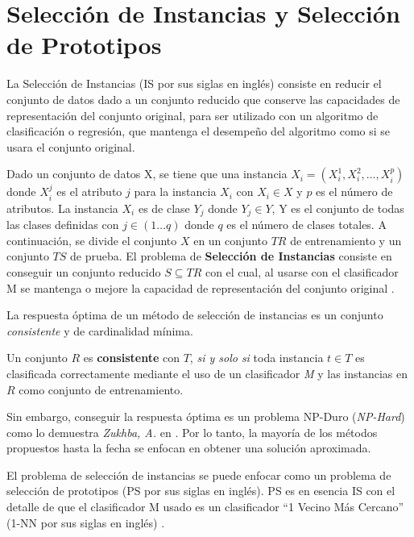 \section{Selección de Instancias y Selección de Prototipos}

La Selección de Instancias (IS por sus siglas en inglés) consiste en reducir el conjunto de datos dado a un conjunto reducido que conserve las capacidades de representación del conjunto original, para ser utilizado con un algoritmo de clasificación o regresión, que mantenga el desempeño del algoritmo como si se usara el conjunto original.\\

\begin{definicion}
Dado un conjunto de datos X, se tiene que una instancia $X_i = (X_i^1,X_i^2,\dots,X_i^p)$ donde $X_i^j$ es el atributo $j$ para la instancia $X_i$ con $X_i\in X$ y $p$ es el número de atributos. La instancia $X_i$ es de clase $Y_j$ donde $Y_j\in Y$, Y es el conjunto de todas las clases definidas con $j\in (1\dots q)$ donde $q$ es el número de clases totales. A continuación, se divide el conjunto $X$ en un conjunto $TR$ de entrenamiento y un conjunto $TS$ de prueba. El problema de \textbf{Selección de Instancias} consiste en conseguir un conjunto reducido $S\subseteq TR$ con el cual, al usarse con el clasificador M se mantenga o mejore la capacidad de representación del conjunto original \cite{garcia2016data}.
\end{definicion}

La respuesta óptima de un método de selección de instancias es un conjunto \emph{consistente} y de cardinalidad mínima.\\

\begin{definicion}
Un conjunto $R$ es \textbf{consistente} con $T$, \emph{si y solo si} toda instancia $t \in T$ es clasificada correctamente mediante el uso de un clasificador \emph{M} y las instancias en $R$ como conjunto de entrenamiento. \cite{flores2014metaheuristics}
\end{definicion}

Sin embargo, conseguir la respuesta óptima es un problema NP-Duro (\emph{NP-Hard}) como lo demuestra \emph{Zukhba, A.} en \cite{zukhba2010np}. Por lo tanto, la mayoría de los métodos propuestos hasta la fecha se enfocan en obtener una solución aproximada.

El problema de selección de instancias se puede enfocar como un problema de selección de prototipos (PS por sus siglas en inglés). PS es en esencia IS con el detalle de que el clasificador M usado es un clasificador ``1 Vecino Más Cercano'' (1-NN por sus siglas en inglés) \cite{garcia2016data}.

